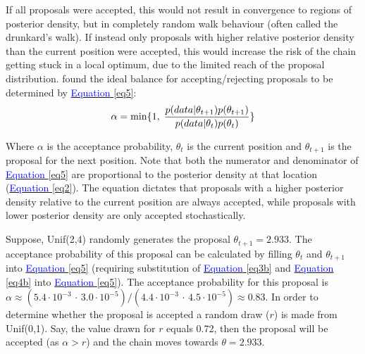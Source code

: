 If all proposals were accepted, this would not result in convergence to regions of posterior density, but in completely random walk behaviour (often called the drunkard's walk). %
If instead only proposals with higher relative posterior density than the current position were accepted, this would increase the risk of the chain getting stuck in a local optimum, due to the limited reach of the proposal distribution. 
\cite{metropolis1953equation} found the ideal balance for accepting/rejecting proposals to be determined by \hyperref[eq5]{\textcolor{blue}{Equation} \ref{eq5}}: 
\begin{equation}
    \mathrm{\alpha} = \min \{  1,\; \frac{p(data|\theta_{t+1} )p(\theta_{t+1})}{p(data|\theta_{t})p(\theta_{t})} \} \label{eq5}\\
\end{equation} 

\noindent Where $\alpha$ is the acceptance probability, $\theta_{t}$ is the current position and $\theta_{t+1}$ is the proposal for the next position. Note that both the numerator and denominator of \hyperref[eq5]{\textcolor{blue}{Equation} \ref{eq5}} are proportional to the posterior density at that location (\hyperref[eq2]{\textcolor{blue}{Equation} \ref{eq2}}). The equation dictates that proposals with a higher posterior density relative to the current position are always accepted, while proposals with lower posterior density are only accepted stochastically. 

Suppose, Unif(2,4) randomly generates the proposal $\theta_{t+1}  = 2.933$. The acceptance probability of this proposal can be calculated by filling $\theta_{t}$ and $\theta_{t+1}$ into \hyperref[eq5]{\textcolor{blue}{Equation} \ref{eq5}} (requiring substitution of \hyperref[eq3b]{\textcolor{blue}{Equation} \ref{eq3b}} and \hyperref[eq4b]{\textcolor{blue}{Equation} \ref{eq4b}} into \hyperref[eq5]{\textcolor{blue}{Equation} \ref{eq5}}). The acceptance probability for this proposal is $\alpha \approx (5.4 \cdot 10^{-3} \, \cdot \, 3.0 \cdot 10^{-5})/(4.4 \cdot 10^{-3} \, \cdot \, 4.5 \cdot 10^{-5}) \approx  0.83$. In order to determine whether the proposal is accepted a random draw ($r$) is made from Unif(0,1). Say, the value drawn for $r$ equals 0.72, then the proposal will be accepted (as $\alpha>r$) and the chain moves towards $\theta = 2.933$.

